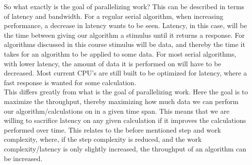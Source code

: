 So what exactly is the goal of parallelizing work? This can be described in terms of latency and bandwidth. For a regular serial algorithm, when increasing performance, a decrease in latency wants to be seen. Latency, in this case, will be the time between giving our algorithm a stimulus until it returns a response. For algorithms discussed in this course stimulus will be data, and thereby the time it takes for an algorithm to be applied to some data. For most serial algorithms, with lower latency, the amount of data it is performed on will have to be decreased. Most current CPU's are still built to be optimized for latency, where a fast response is wanted for some calculation.\\
This differs greatly from what is the goal of parallelizing work. Here the goal is to maximize the throughput, thereby maximizing how much data we can perform our algorithm/calculations on in a given time span. This means that we are willing to sacrifice latency on any given calculation if it improves the calculations performed over time. This relates to the before mentioned step and work complexity, where, if the step complexity is reduced, and the work complexity/latency is only slightly increased, the throughput of an algorithm can be increased.